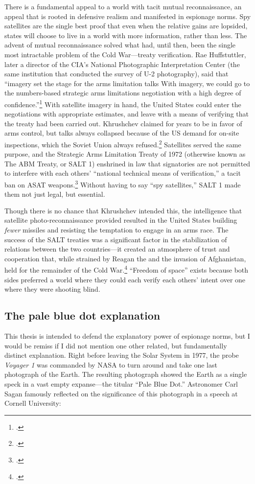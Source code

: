 \documentclass{memoir}
\begin{document}
There is a fundamental appeal to a world with tacit mutual reconnaissance, an appeal that is rooted in defensive realism and manifested in espionage norms. Spy satellites are the single best proof that even when the relative gains are lopsided, states will choose to live in a world with more information, rather than less. The advent of mutual reconnaissance solved what had, until then, been the single most intractable problem of the Cold War---treaty verification. Rae Huffstuttler, later a director of the CIA's National Photographic Interpretation Center (the same institution that conducted the survey of U-2 photography), said that ``imagery set the stage for the arms limitation talks \textelp{} With imagery, we could go to the numbers-based strategic arms limitations negotiation with a high degree of confidence.''\footcite[p.~403]{brugioni_eyes_2010} With satellite imagery in hand, the United States could enter the negotiations with appropriate estimates, and leave with a means of verifying that the treaty had been carried out. Khrushchev claimed for years to be in favor of arms control, but talks always collapsed because of the US demand for on-site inspections, which the Soviet Union always refused.\footcite[p.~255]{mcdougall_heavens_1985} Satellites served the same purpose, and the Strategic Arms Limitation Treaty of 1972 (otherwise known as The ABM Treaty, or SALT 1) enshrined in law that signatories are not permitted to interfere with each others' ``national technical means of verification,'' a tacit ban on ASAT weapons.\footcite[p.~431]{mcdougall_heavens_1985} Without having to say ``spy satellites,'' SALT 1 made them not just legal, but essential.

Though there is no chance that Khrushchev intended this, the intelligence that satellite photo-reconnaissance provided resulted in the United States building \emph{fewer} missiles and resisting the temptation to engage in an arms race. The success of the SALT treaties was a significant factor in the stabilization of relations between the two countries---it created an atmosphere of trust and cooperation that, while strained by Reagan the and the invasion of Afghanistan, held for the remainder of the Cold War.\footcite[p.~179]{lindgren_trust_2000} ``Freedom of space'' exists because both sides preferred a world where they could each verify each others' intent over one where they were shooting blind.

\subsection{The pale blue dot explanation}
This thesis is intended to defend the explanatory power of espionage norms, but I would be remiss if I did not mention one other related, but fundamentally distinct explanation. Right before leaving the Solar System in 1977, the probe \emph{Voyager 1} was commanded by NASA to turn around and take one last photograph of the Earth. The resulting photograph showed the Earth as a single speck in a vast empty expanse---the titular ``Pale Blue Dot.'' Astronomer Carl Sagan famously reflected on the significance of this photograph in a speech at Cornell University:
\end{document}
